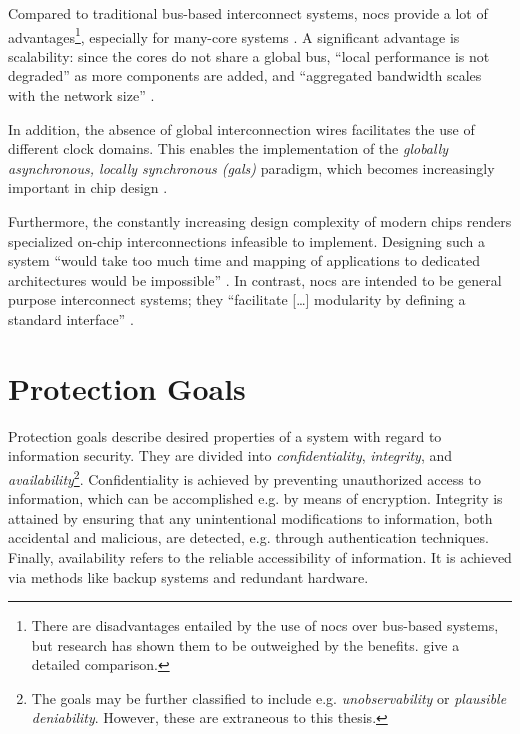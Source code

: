 Compared to traditional bus-based interconnect systems, \glspl{noc} provide a lot of advantages\footnote{There are disadvantages entailed by
the use of \glspl{noc} over bus-based systems, but research has shown them to be outweighed by the benefits. \citeauthor{tatas16designingnocs}
\cite{tatas16designingnocs} give a detailed comparison.}, especially for many-core systems
\cite[5\psqq]{tatas16designingnocs}. A significant advantage is scalability: since the cores do not share a global bus, \enquote{local performance is not
degraded} \cite[6]{tatas16designingnocs} as more components are added, and \enquote{aggregated bandwidth scales with the network size}
\cite[6]{tatas16designingnocs}.

In addition, the absence of global interconnection wires facilitates the use of different clock domains. This enables the implementation of the
\textit{globally asynchronous, locally synchronous (\gls{gals})} paradigm, which becomes increasingly important in chip design
\cites[3]{kumar02networkonchip}[2]{ivanov05nocintroduction}.

Furthermore, the constantly increasing design complexity of modern chips \cite{mack11mooreslaw} renders specialized on-chip
interconnections infeasible to implement. Designing such a system \enquote{would take too much time and mapping of applications to dedicated
architectures would be impossible} \cite[1]{kumar02networkonchip}. In contrast, \glspl{noc} are intended to be general purpose interconnect systems; they
\enquote{facilitate […] modularity by defining a standard interface} \cite[1]{dally01routepacketsnotwires}.


\section{Protection Goals}\label{sec:protectiongoals}
Protection goals describe desired properties of a system with regard to information security. They are divided into \textit{confidentiality},
\textit{integrity}, and \textit{availability}\footnote{The goals may be further classified to include e.g. \textit{unobservability} or \textit{plausible
deniability}. However, these are extraneous to this thesis.}. Confidentiality is achieved by preventing unauthorized access to information, which
can be accomplished e.g. by means of encryption. Integrity is attained by ensuring that any unintentional modifications to information, both accidental and
malicious, are detected, e.g. through authentication techniques. Finally, availability refers to the reliable accessibility of information. It is
achieved via methods like backup systems and redundant hardware.


